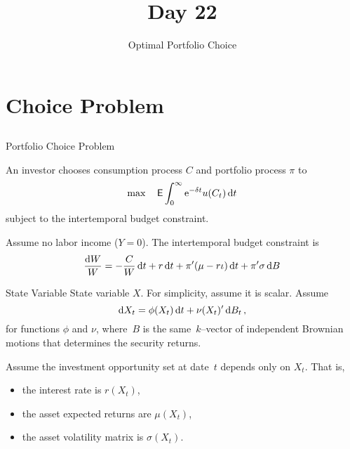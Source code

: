 \documentclass[xcolor=dvipsnames,10pt]{beamer}
\begin{document}
\title{\vskip 0.5in Day 22}
\subtitle{Optimal Portfolio Choice}

\begin{frame}
  \titlepage
\end{frame}

\section{Choice Problem}\subsection{}

\begin{frame}{Portfolio Choice Problem}

An investor chooses consumption process $C$ and portfolio process $\pi$ to 
$$\max \quad \mathsf{E} \int_0^\infty \mathrm{e}^{-\delta t}u(C_t)\,\mathrm{d} t$$
subject to the intertemporal budget constraint.

 Assume no labor income ($Y=0$).  The intertemporal budget constraint is
$$\frac{\mathrm{d} W}{W} = -\frac{C}{W}\,\mathrm{d} t + r\,\mathrm{d} t+\pi'(\mu-r\iota)\,\mathrm{d} t + \pi'\sigma\,\mathrm{d} B$$

\end{frame}


\begin{frame}{State Variable}
  State variable $X$.  For simplicity, assume it is scalar.  
 Assume 
$$
	\mathrm{d} X_t = \phi(X_t)\,\mathrm{d} t + \nu(X_t)'\,\mathrm{d} B_t\,,
$$
for functions $\phi$ and $\nu$, where~$B$ is the same~$k$--vector of independent Brownian motions that determines the security 
returns.

 Assume the investment opportunity set at date~$t$ depends only on $X_t$.  That is,
 \vspace*{-\baselineskip}
\begin{itemize}
    \item  the interest rate is $r(X_t)$,
\item the asset expected returns are $\mu(X_t)$,
\item the asset volatility matrix is $\sigma(X_t)$.
\end{itemize}
\end{frame}

\end{document}
